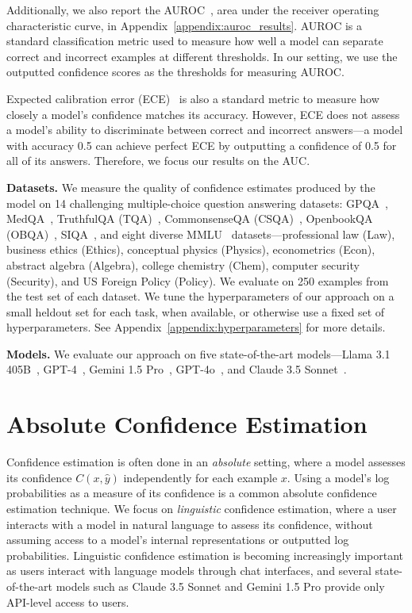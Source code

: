 Additionally, we also report the AUROC~\citep{hendrycks2017baseline,xiong2023can}, area under the receiver operating characteristic curve, in Appendix~\ref{appendix:auroc_results}. AUROC is a standard classification metric used to measure how well a model can separate correct and incorrect examples at different thresholds. In our setting, we use the outputted confidence scores as the thresholds for measuring AUROC. 

Expected calibration error (ECE)~\citep{Guo2017OnCO, Naeini2015ObtainingWC} is also a standard metric to measure how closely a model's confidence matches its accuracy. However, ECE does not assess a model's ability to discriminate between correct and incorrect answers---a model with accuracy 0.5 can achieve perfect ECE by outputting a confidence of 0.5 for all of its answers. Therefore, we focus our results on the AUC.

\textbf{Datasets.} We measure the quality of confidence estimates produced by the model on 14 challenging multiple-choice question answering datasets: GPQA~\citep{Rein2023GPQAAG}, MedQA~\citep{jin2021medqa}, TruthfulQA (TQA)~\citep{lin2021truthful}, CommonsenseQA (CSQA)~\citep{talmor2019commonsenseqa},
OpenbookQA (OBQA)~\citep{mihaylov2018openbook}, SIQA~\citep{siqa}, and eight diverse MMLU~\citep{hendrycks2021measuring} datasets---professional law (Law), business ethics (Ethics), conceptual physics (Physics),
econometrics (Econ), abstract algebra (Algebra), college chemistry (Chem), computer security (Security), and US Foreign Policy (Policy). We evaluate on 250 examples from the test set of each dataset. We tune the hyperparameters of our approach on a small heldout set for each task, when available, or otherwise use a fixed set of hyperparameters. See Appendix~\ref{appendix:hyperparameters} for more details.

\textbf{Models.} We evaluate our approach on five state-of-the-art models---Llama 3.1 405B~\citep{llama3.1}, GPT-4~\citep{gpt-4}, Gemini 1.5 Pro~\citep{gemini-1.5-pro}, GPT-4o~\citep{gpt-4o}, and Claude 3.5 Sonnet~\citep{claude-3.5-sonnet}.

\section{Absolute Confidence Estimation}
\label{sec:abs_conf_estimation}
Confidence estimation is often done in an \textit{absolute} setting, where a model assesses its confidence $C(x, \hat y)$ independently for each example $x$. Using a model's log probabilities as a measure of its confidence is a common absolute confidence estimation technique. We focus on \textit{linguistic} confidence estimation, where a user interacts with a model in natural language to assess its confidence, without assuming access to a model's internal representations or outputted log probabilities. Linguistic confidence estimation is becoming increasingly important as users interact with language models through chat interfaces, and several state-of-the-art models such as Claude 3.5 Sonnet and Gemini 1.5 Pro provide only API-level access to users.

